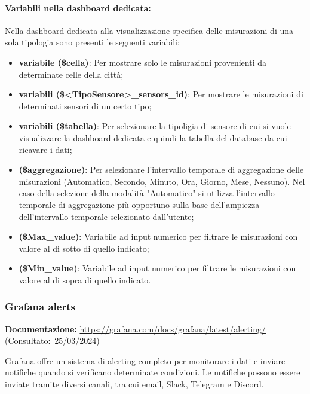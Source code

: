 \paragraph*{Variabili nella dashboard dedicata:} \label{sec:var_dedicate}
Nella dashboard dedicata alla visualizzazione specifica delle misurazioni di una sola tipologia sono presenti le seguenti variabili:
\begin{itemize}
    \item \textbf{variabile (\$cella)}: Per mostrare solo le misurazioni provenienti da determinate celle della città;
    \item \textbf{variabili (\$<TipoSensore>\_sensors\_id)}: Per mostrare le misurazioni di determinati sensori di un certo tipo;
    \item \textbf{variabili (\$tabella)}: Per selezionare la tipoligia di sensore di cui si vuole visualizzare la dashboard dedicata e quindi la tabella del database da cui ricavare i dati;
    \item \textbf{(\$aggregazione)}: Per selezionare l'intervallo temporale di aggregazione delle misurazioni
    (Automatico, Secondo, Minuto, Ora, Giorno, Mese, Nessuno).
    Nel caso della selezione della modalità "Automatico" si utilizza l'intervallo temporale di aggregazione più opportuno sulla base dell'ampiezza dell'intervallo temporale selezionato dall'utente;
    \item \textbf{(\$Max\_value)}: Variabile ad input numerico per filtrare le misurazioni con valore al di sotto di quello indicato;
    \item \textbf{(\$Min\_value)}: Variabile ad input numerico per filtrare le misurazioni con valore al di sopra di quello indicato.
\end{itemize}



\subsubsection{Grafana alerts}
\textbf{Documentazione:}
\url{https://grafana.com/docs/grafana/latest/alerting/} (Consultato:~25/03/2024)

Grafana offre un sistema di alerting completo per monitorare i dati e inviare notifiche quando si verificano determinate condizioni. Le notifiche possono essere inviate tramite diversi canali, tra cui email, Slack, Telegram e Discord.

